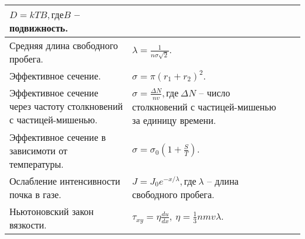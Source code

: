 \documentclass{article}
\begin{document}
\begin{tabular}{ |p{4.3cm}|p{5.2cm}|p{4.3cm}|p{5.2cm}|  }
$D = kTB,  \text{где} B$ -- подвижность.                                     &  %
                                                                             &  %
                                                                             \\ %
\hline
Средняя длина свободного пробега.                                            &  %
$\lambda = \frac{1}{n\sigma \sqrt{2}}.$                                      &  %
                                                                             &  %
                                                                             \\ %
\hline
Эффективное сечение.                                                         &  %
$\sigma = \pi (r_1 + r_2)^2.$                                                &  %
                                                                             &  %
                                                                             \\ %
\hline
Эффективное сечение через частоту столкновений с частицей-мишенью.           &  %
$\sigma = \frac{\Delta N}{nv}, \text{где} \: \Delta N$ -- число столкновений 
с частицей-мишенью за единицу времени.                                       &  %
                                                                             &  %
                                                                             \\ %
\hline
Эффективное сечение в зависимоти от температуры.                             &  %
$\sigma = \sigma_0 \left( 1 + \frac{S}{T} \right).$                         &  %
                                                                             &  %
                                                                             \\ %
\hline
Ослабление интенсивности почка в газе.                                       &  %
$J = J_0 e^{-x/\lambda}, \text{где} \: \lambda$ -- длина свободного пробега. &  %
                                                                             &  %
                                                                             \\ %
\hline
Ньютоновский закон вязкости.                                                 &  %
$\tau_{xy} = \eta \frac{du}{dx}, \: \eta = \frac{1}{3}nmv\lambda.$           &  %
                                                                             &  %
                                                                             \\ %
\hline
\end{tabular}
\end{document}

